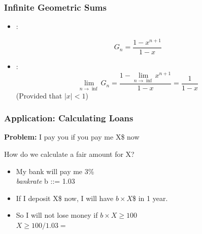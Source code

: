 \documentclass{beamer}
\begin{document}
\begin{frame}
  \frametitle{Infinite Geometric Sums}

  {\larger

    \begin{itemize}
    \item {}:

      \begin{equation}
        G_n = \frac{1-x^{n+1}}{1-x}
      \end{equation}
      
    \item {}:
      \begin{equation}
        \lim_{n\rightarrow\inf}G_n = \frac{1-\lim_{n\rightarrow\inf}x^{n+1}}{1-x} = \frac{1}{1-x}
      \end{equation}
      \hfill(Provided that $|x| < 1$)
    \end{itemize}
    
  }
\end{frame}

\begin{frame}
  \frametitle{Application: Calculating Loans}

  {\larger

    {\bf Problem:} I pay you  if you
    \alert{pay me X\$ now}

    \bigskip

    How do we calculate a fair amount for \alert{X}?
    \begin{itemize}
    \item <2-> My bank will pay me 3\% \\
      \hfill{\emph{bankrate} b ::= 1.03}
    \item <3-> If I deposit \alert{X\$} now, I will have
      \alert{$b\times X$\$} in 1 year.
    \item <3-> So I will not lose money if $b\times X \geq 100$\\
      \hfill $X \geq 100/1.03 =$ 
    \end{itemize}
    
  }  
\end{frame}
\end{document}
